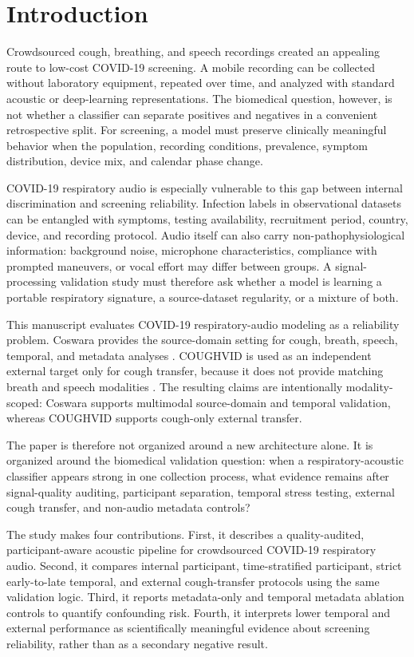 \documentclass[preprint,12pt]{elsarticle}
\begin{document}
\section{Introduction}

Crowdsourced cough, breathing, and speech recordings created an appealing route to low-cost COVID-19 screening. A mobile recording can be collected without laboratory equipment, repeated over time, and analyzed with standard acoustic or deep-learning representations. The biomedical question, however, is not whether a classifier can separate positives and negatives in a convenient retrospective split. For screening, a model must preserve clinically meaningful behavior when the population, recording conditions, prevalence, symptom distribution, device mix, and calendar phase change.

COVID-19 respiratory audio is especially vulnerable to this gap between internal discrimination and screening reliability. Infection labels in observational datasets can be entangled with symptoms, testing availability, recruitment period, country, device, and recording protocol. Audio itself can also carry non-pathophysiological information: background noise, microphone characteristics, compliance with prompted maneuvers, or vocal effort may differ between groups. A signal-processing validation study must therefore ask whether a model is learning a portable respiratory signature, a source-dataset regularity, or a mixture of both.

This manuscript evaluates COVID-19 respiratory-audio modeling as a reliability problem. Coswara provides the source-domain setting for cough, breath, speech, temporal, and metadata analyses \citep{bhattacharya2023coswara}. COUGHVID is used as an independent external target only for cough transfer, because it does not provide matching breath and speech modalities \citep{orlandic2021coughvid}. The resulting claims are intentionally modality-scoped: Coswara supports multimodal source-domain and temporal validation, whereas COUGHVID supports cough-only external transfer.

The paper is therefore not organized around a new architecture alone. It is organized around the biomedical validation question: when a respiratory-acoustic classifier appears strong in one collection process, what evidence remains after signal-quality auditing, participant separation, temporal stress testing, external cough transfer, and non-audio metadata controls?

The study makes four contributions. First, it describes a quality-audited, participant-aware acoustic pipeline for crowdsourced COVID-19 respiratory audio. Second, it compares internal participant, time-stratified participant, strict early-to-late temporal, and external cough-transfer protocols using the same validation logic. Third, it reports metadata-only and temporal metadata ablation controls to quantify confounding risk. Fourth, it interprets lower temporal and external performance as scientifically meaningful evidence about screening reliability, rather than as a secondary negative result.
\end{document}
